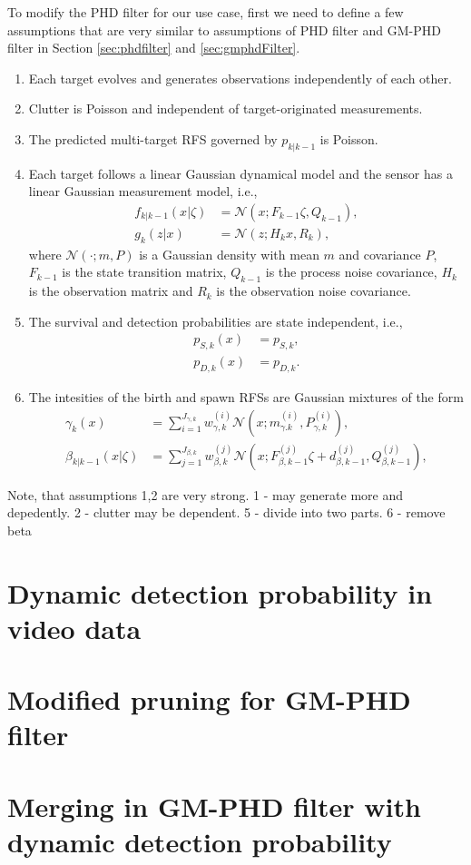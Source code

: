 To modify the PHD filter for our use case, first we need to define a few assumptions that are very similar to
assumptions of PHD filter and GM-PHD filter in Section \ref{sec:phdfilter} and \ref{sec:gmphdFilter}.
\begin{enumerate}
  \item Each target evolves and generates observations independently of each other.
  \item Clutter is Poisson and independent of target-originated measurements.
  \item The predicted multi-target RFS governed by $p_{k|k-1}$ is Poisson.
  \item Each target follows a linear Gaussian dynamical model and the sensor has a linear
  Gaussian measurement model, i.e.,
        \begin{align}
          f_{k|k-1}(x|\zeta) &= \mathcal{N}(x; F_{k-1}\zeta, Q_{k-1}),\\
          g_k(z|x) &= \mathcal{N}(z;H_kx, R_k),
        \end{align}
  where $\mathcal{N}(\cdot;m,P)$ is a Gaussian density with mean $m$ and covariance $P$, $F_{k-1}$ is the state transition matrix, $Q_{k-1}$ is the process noise covariance, $H_k$ is the observation matrix and $R_k$ is the observation noise covariance.
  \item The survival and detection probabilities are state independent, i.e.,
  \begin{align}
    p_{S,k}(x) &= p_{S,k},\\
    p_{D,k}(x) &= p_{D,k}.
  \end{align}
  \item The intesities of the birth and spawn RFSs are Gaussian mixtures of the form
  \begin{align}
    \gamma_k(x) &= \sum_{i=1}^{J_{\gamma,k}}w_{\gamma,k}^{(i)} \mathcal{N}(x; m_{\gamma.k}^{(i)}, P_{\gamma,k}^{(i)}),\\
    \beta_{k|k-1}(x|\zeta) &= \sum_{j=1}^{J_{\beta,k}} w_{\beta,k}^{(j)} \mathcal{N}(x;F_{\beta,k-1}^{(j)}\zeta + d_{\beta,k-1}^{(j)}, Q_{\beta,k-1}^{(j)}),
  \end{align}
\end{enumerate}

Note, that assumptions 1,2 are very strong. 1 - may generate more and depedently. 2 - clutter may be dependent. 5 -
divide into two parts. 6 - remove beta
\section{Dynamic detection probability in video data}
\section{Modified pruning for GM-PHD filter}
\section{Merging in GM-PHD filter with dynamic detection probability}